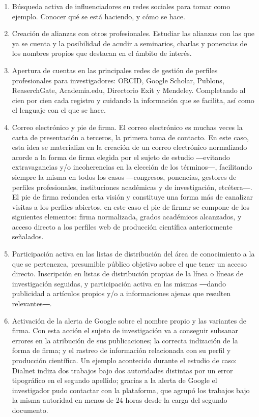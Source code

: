 \documentclass{textolivre}
\begin{document}
\begin{enumerate}[label={\Alph*}]
    \item Búsqueda activa de influenciadores en redes sociales para tomar como ejemplo. Conocer qué se está haciendo, y cómo se hace.
    \item Creación de alianzas con otros profesionales. Estudiar las alianzas con las que ya se cuenta y la posibilidad de acudir a seminarios, charlas y ponencias de los nombres propios que destacan en el ámbito de interés. 
    \item Apertura de cuentas en las principales redes de gestión de perfiles profesionales para investigadores: ORCID, Google Scholar, Publons, ReaserchGate, Academia.edu, Directorio Exit y Mendeley. Completando al cien por cien cada registro y cuidando la información que se facilita, así como el lenguaje con el que se hace.
    \item Correo electrónico y pie de firma. El correo electrónico es muchas veces la carta de presentación a terceros, la primera toma de contacto. En este caso, esta idea se materializa en la creación de un correo electrónico normalizado acorde a la forma de firma elegida por el sujeto de estudio ―evitando extravagancias y/o incoherencias en la elección de los términos―, facilitando siempre la misma en todos los casos ―congresos, ponencias, gestores de perfiles profesionales, instituciones académicas y de investigación, etcétera―. El pie de firma redondea esta visión y constituye una forma más de canalizar visitas a los perfiles abiertos, en este caso el pie de firmar se compone de los siguientes elementos: firma normalizada, grados académicos alcanzados, y acceso directo a los perfiles web de producción científica anteriormente señalados.
    \item Participación activa en las listas de distribución del área de conocimiento a la que se pertenezca, presumible público objetivo sobre el que tener un acceso directo. Inscripción en listas de distribución propias de la línea o líneas de investigación seguidas, y participación activa en las mismas ―dando publicidad a artículos propios y/o a informaciones ajenas que resulten relevantes―.
    \item Activación de la alerta de Google sobre el nombre propio y las variantes de firma. Con esta acción el sujeto de investigación va a conseguir subsanar errores en la atribución de sus publicaciones; la correcta indización de la forma de firma; y el rastreo de información relacionada con su perfil y producción científica. Un ejemplo acontecido durante el estudio de caso: Dialnet indiza dos trabajos bajo dos autoridades distintas por un error tipográfico en el segundo apellido; gracias a la alerta de Google el investigador pudo contactar con la plataforma, que agrupó los trabajos bajo la misma autoridad en menos de 24 horas desde la carga del segundo documento.

\end{enumerate}
\end{document}
